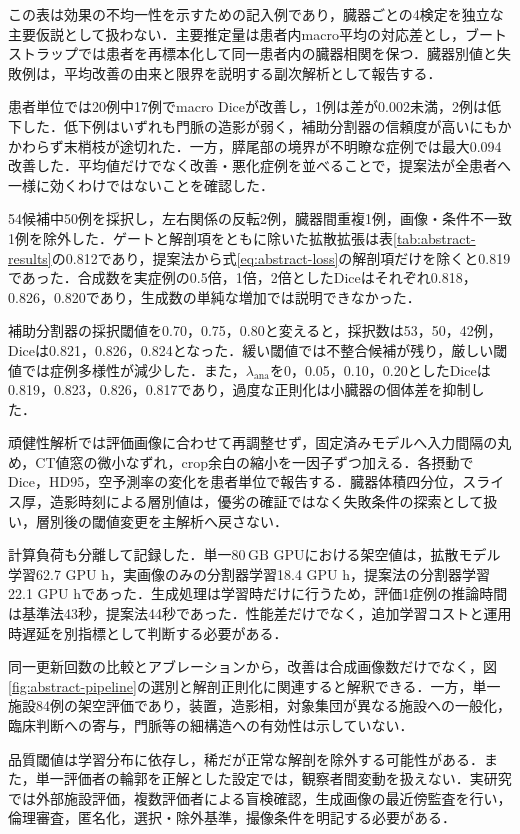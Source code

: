 この表は効果の不均一性を示すための記入例であり，臓器ごとの4検定を独立な主要仮説として扱わない．主要推定量は患者内macro平均の対応差とし，ブートストラップでは患者を再標本化して同一患者内の臓器相関を保つ．臓器別値と失敗例は，平均改善の由来と限界を説明する副次解析として報告する．

患者単位では20例中17例でmacro Diceが改善し，1例は差が0.002未満，2例は低下した．低下例はいずれも門脈の造影が弱く，補助分割器の信頼度が高いにもかかわらず末梢枝が途切れた．一方，膵尾部の境界が不明瞭な症例では最大0.094改善した．平均値だけでなく改善・悪化症例を並べることで，提案法が全患者へ一様に効くわけではないことを確認した．

54候補中50例を採択し，左右関係の反転2例，臓器間重複1例，画像・条件不一致1例を除外した．ゲートと解剖項をともに除いた拡散拡張は表\ref{tab:abstract-results}の0.812であり，提案法から式\eqref{eq:abstract-loss}の解剖項だけを除くと0.819であった．合成数を実症例の0.5倍，1倍，2倍としたDiceはそれぞれ0.818，0.826，0.820であり，生成数の単純な増加では説明できなかった．

補助分割器の採択閾値を0.70，0.75，0.80と変えると，採択数は53，50，42例，Diceは0.821，0.826，0.824となった．緩い閾値では不整合候補が残り，厳しい閾値では症例多様性が減少した．また，$\lambda_{\mathrm{ana}}$を0，0.05，0.10，0.20としたDiceは0.819，0.823，0.826，0.817であり，過度な正則化は小臓器の個体差を抑制した．

頑健性解析では評価画像に合わせて再調整せず，固定済みモデルへ入力間隔の丸め，CT値窓の微小なずれ，crop余白の縮小を一因子ずつ加える．各摂動でDice，HD95，空予測率の変化を患者単位で報告する．臓器体積四分位，スライス厚，造影時刻による層別値は，優劣の確証ではなく失敗条件の探索として扱い，層別後の閾値変更を主解析へ戻さない．

計算負荷も分離して記録した．単一$80\,\mathrm{GB}$ GPUにおける架空値は，拡散モデル学習62.7 GPU h，実画像のみの分割器学習18.4 GPU h，提案法の分割器学習22.1 GPU hであった．生成処理は学習時だけに行うため，評価1症例の推論時間は基準法43秒，提案法44秒であった．性能差だけでなく，追加学習コストと運用時遅延を別指標として判断する必要がある．

同一更新回数の比較とアブレーションから，改善は合成画像数だけでなく，図\ref{fig:abstract-pipeline}の選別と解剖正則化に関連すると解釈できる．一方，単一施設84例の架空評価であり，装置，造影相，対象集団が異なる施設への一般化，臨床判断への寄与，門脈等の細構造への有効性は示していない．

品質閾値は学習分布に依存し，稀だが正常な解剖を除外する可能性がある．また，単一評価者の輪郭を正解とした設定では，観察者間変動を扱えない．実研究では外部施設評価，複数評価者による盲検確認，生成画像の最近傍監査を行い，倫理審査，匿名化，選択・除外基準，撮像条件を明記する必要がある．

